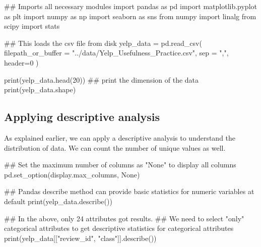 \documentclass[
  letterpaper,
]{scrbook}
\newenvironment{Shaded}{\begin{snugshade}}{\end{snugshade}}
\newcommand{\BuiltInTok}[1]{\textcolor[rgb]{0.00,0.23,0.31}{#1}}
\newcommand{\CommentTok}[1]{\textcolor[rgb]{0.37,0.37,0.37}{#1}}
\newcommand{\DecValTok}[1]{\textcolor[rgb]{0.68,0.00,0.00}{#1}}
\newcommand{\ImportTok}[1]{\textcolor[rgb]{0.00,0.46,0.62}{#1}}
\newcommand{\NormalTok}[1]{\textcolor[rgb]{0.00,0.23,0.31}{#1}}
\newcommand{\OperatorTok}[1]{\textcolor[rgb]{0.37,0.37,0.37}{#1}}
\newcommand{\StringTok}[1]{\textcolor[rgb]{0.13,0.47,0.30}{#1}}
\newcommand{\VariableTok}[1]{\textcolor[rgb]{0.07,0.07,0.07}{#1}}
\begin{document}
\begin{Shaded}
\begin{Highlighting}[]
\CommentTok{\#\# Imports all necessary modules}
\ImportTok{import}\NormalTok{ pandas }\ImportTok{as}\NormalTok{ pd}
\ImportTok{import}\NormalTok{ matplotlib.pyplot }\ImportTok{as}\NormalTok{ plt}
\ImportTok{import}\NormalTok{ numpy }\ImportTok{as}\NormalTok{ np}
\ImportTok{import}\NormalTok{ seaborn }\ImportTok{as}\NormalTok{ sns}
\ImportTok{from}\NormalTok{ numpy }\ImportTok{import}\NormalTok{ linalg}
\ImportTok{from}\NormalTok{ scipy }\ImportTok{import}\NormalTok{ stats}

\CommentTok{\#\# This loads the csv file from disk}
\NormalTok{yelp\_data }\OperatorTok{=}\NormalTok{ pd.read\_csv(}
\NormalTok{    filepath\_or\_buffer }\OperatorTok{=} \StringTok{"../data/Yelp\_Usefulness\_Practice.csv"}\NormalTok{, sep }\OperatorTok{=} \StringTok{","}\NormalTok{, header}\OperatorTok{=}\DecValTok{0}\NormalTok{ )}

\BuiltInTok{print}\NormalTok{(yelp\_data.head(}\DecValTok{20}\NormalTok{))}
\CommentTok{\#\# print the dimension of the data}
\BuiltInTok{print}\NormalTok{(yelp\_data.shape)}
\end{Highlighting}
\end{Shaded}

\subsection*{Applying descriptive
analysis}\label{applying-descriptive-analysis}

As explained earlier, we can apply a descriptive analysis to understand
the distribution of data. We can count the number of unique values as
well.

\begin{Shaded}
\begin{Highlighting}[]
\CommentTok{\#\# Set the maximum number of columns as "None" to display all columns}
\NormalTok{pd.set\_option(}\StringTok{\textquotesingle{}display.max\_columns\textquotesingle{}}\NormalTok{, }\VariableTok{None}\NormalTok{)}

\CommentTok{\#\# Pandas\textquotesingle{} describe method can provide basic statistics for numeric variables at default}
\BuiltInTok{print}\NormalTok{(yelp\_data.describe())}
\end{Highlighting}
\end{Shaded}

\begin{Shaded}
\begin{Highlighting}[]
\CommentTok{\#\# In the above, only 24 attributes got results.}
\CommentTok{\#\# We need to select "only" categorical attributes to get descriptive statistics for categorical attributes}
\BuiltInTok{print}\NormalTok{(yelp\_data[[}\StringTok{"review\_id"}\NormalTok{, }\StringTok{"class"}\NormalTok{]].describe())}
\end{Highlighting}
\end{Shaded}
\end{document}
